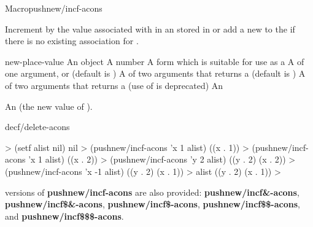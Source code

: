 \documentclass[10pt,twoside,english,pdftex]{article}
\begin{document}
\begin{functiondoc}{Macro}{pushnew/incf-acons}{
     
    \returns{} }
%
%
%
%
  
\fnsyntax

\fnpurpose Increment by  the value associated with
 in an  stored in  or
add a new   to the
 if there is no existing association for
.

\fnpackage {}

\fnmodule {}

\fnargs
\begin{args}{new-place-value}
\arg[item] An object
\arg[increment] A number
\arg[place] A form which is suitable for use as a
\arg[key] A  of one argument, or \nil{} (default is \nil)
\arg[test] A  of two arguments that returns a
 (default is ) 
 A  of two arguments that returns a
 (use of  is deprecated)
 An 
\end{args}

\fnreturns An  (the new value of ). 

\begin{alsos}{decf/delete-acons}
\end{alsos}

\fnexamples
%
\W\supp
\begin{example}
  > (setf alist nil)
  nil
  > (pushnew/incf-acons 'x 1 alist)
  ((x . 1))
  > (pushnew/incf-acons 'x 1 alist)
  ((x . 2))\goodpagebreak
  > (pushnew/incf-acons 'y 2 alist)
  ((y . 2) (x . 2))
  > (pushnew/incf-acons 'x -1 alist)
  ((y . 2) (x . 1))
  > alist
  ((y . 2) (x . 1))
  >
\end{example}

\fnnote
%
%
%
%
%
%
%
 versions of
\textbf{pushnew/incf-acons} are also provided: \textbf{pushnew/incf\&-acons},
\textbf{pushnew/incf\$\&-acons}, \textbf{pushnew/incf\$-acons},
\textbf{pushnew/incf\$\$-acons}, and \textbf{pushnew/incf\$\$\$-acons}.

\end{functiondoc}
\end{document}
